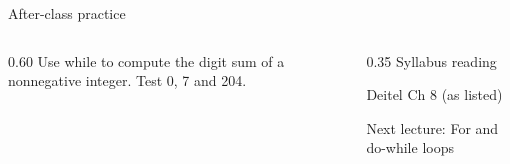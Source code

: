 \documentclass[10pt,aspectratio=169]{beamer}
\begin{document}
\begin{frame}[fragile,t]{After-class practice}
\begin{columns}[T,onlytextwidth]\begin{column}{0.60\textwidth}
Use while to compute the digit sum of a nonnegative integer. Test 0, 7 and 204.
\end{column}\begin{column}{0.35\textwidth}\small
Syllabus reading\par Deitel Ch 8 (as listed)

Next lecture: For and do-while loops
\end{column}\end{columns}
\end{frame}
\end{document}
